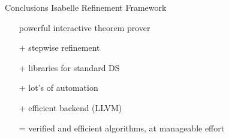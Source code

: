 \documentclass[fleqn]{beamer}
\begin{document}
\begin{frame}{Conclusions}
  Isabelle Refinement Framework
    \begin{itemize}
     \item[{}] powerful interactive theorem prover
     \item[+] stepwise refinement
     \item[+] libraries for standard DS
     \item[+] lot's of automation
     \item[+] efficient backend (LLVM)
     \item[=] verified and efficient algorithms, at manageable effort


%
%
%
%
%
%

\end{itemize}
\end{frame}
\end{document}

